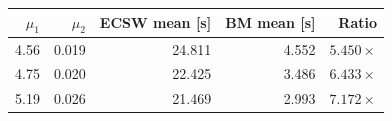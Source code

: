 \begin{tabular}{@{}rrrrr@{}}
\toprule
\textbf{$\mu_1$} & \textbf{$\mu_2$} & \textbf{ECSW mean [s]} & \textbf{BM mean [s]} & \textbf{Ratio}\\
\midrule
4.56 & 0.019 & 24.811 & 4.552 & $5.450\times$\\
4.75 & 0.020 & 22.425 & 3.486 & $6.433\times$\\
5.19 & 0.026 & 21.469 & 2.993 & $7.172\times$\\
\bottomrule
\end{tabular}
